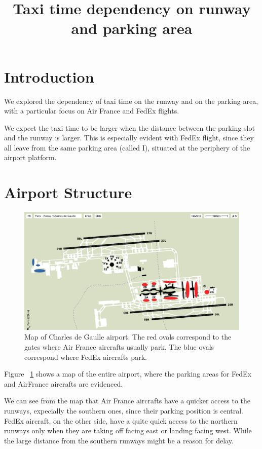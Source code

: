 \documentclass{article}
\begin{document}
	
	\title{Taxi time dependency on runway and parking area}
	\maketitle
\section*{Introduction}
We explored the dependency of taxi time on the runway and on the parking area, with a particular focus on Air France and FedEx flights. 

We expect the taxi time to be larger when the distance between the parking slot and the runway is larger. This is especially evident with FedEx flight, since they all leave from the same parking area (called I), situated at the periphery of the airport platform.
\section{Airport Structure}
\begin{figure}[h]
	\centering
	\includegraphics[width=\textwidth]{map_airport_filled}
	\caption{Map of Charles de Gaulle airport. The red ovals correspond to the gates where Air France aircrafts usually park. The blue ovals correspond where FedEx aircrafts park.}
	\label{map}
\end{figure}

Figure ~\ref{map} shows a map of the entire airport, where the parking areas for FedEx and AirFrance aircrafts are evidenced.

We can see from the map that Air France aircrafts have a quicker access to the runways, expecially the southern ones, since their parking position is central. FedEx aircraft, on the other side, have a quite quick access to the northern runways only when they are taking off facing east or landing facing west. While the large distance from the southern runways might be a reason for delay.
\end{document}
